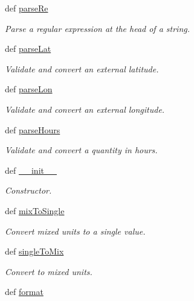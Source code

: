 \begin{DoxyCompactItemize}
def \hyperlink{namespaceamonpy_1_1sim_1_1sidereal_a3815664befcad914fcf2a8ec4ec1bc7e}{parse\-Re}
\begin{DoxyCompactList}\small\item\em Parse a regular expression at the head of a string. \end{DoxyCompactList}\item 
def \hyperlink{namespaceamonpy_1_1sim_1_1sidereal_a9e83b3626ba431e8272fcdd811d969da}{parse\-Lat}
\begin{DoxyCompactList}\small\item\em Validate and convert an external latitude. \end{DoxyCompactList}\item 
def \hyperlink{namespaceamonpy_1_1sim_1_1sidereal_a501650d07baa2c24d0881e3103132754}{parse\-Lon}
\begin{DoxyCompactList}\small\item\em Validate and convert an external longitude. \end{DoxyCompactList}\item 
def \hyperlink{namespaceamonpy_1_1sim_1_1sidereal_a0805787564084c416b4e201e710158f8}{parse\-Hours}
\begin{DoxyCompactList}\small\item\em Validate and convert a quantity in hours. \end{DoxyCompactList}\item 
def \hyperlink{namespaceamonpy_1_1sim_1_1sidereal_a0d12fc226bca67ce88441c23999a0985}{\-\_\-\-\_\-init\-\_\-\-\_\-}
\begin{DoxyCompactList}\small\item\em Constructor. \end{DoxyCompactList}\item 
def \hyperlink{namespaceamonpy_1_1sim_1_1sidereal_acb147e1c9df6f3d42fbdda60fce84c89}{mix\-To\-Single}
\begin{DoxyCompactList}\small\item\em Convert mixed units to a single value. \end{DoxyCompactList}\item 
def \hyperlink{namespaceamonpy_1_1sim_1_1sidereal_a73379ed810f672f10a58df0115a09537}{single\-To\-Mix}
\begin{DoxyCompactList}\small\item\em Convert to mixed units. \end{DoxyCompactList}\item 
def \hyperlink{namespaceamonpy_1_1sim_1_1sidereal_a98956f2abc53776c6eafe8da523cb397}{format}

\end{DoxyCompactItemize}

